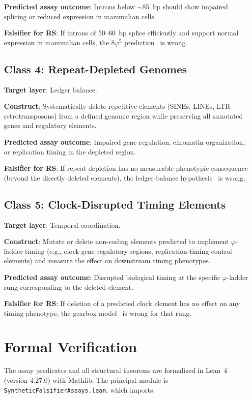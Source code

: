 \documentclass[11pt,twocolumn]{article}
\begin{document}
\textbf{Predicted assay outcome}: Introns below $\sim$85~bp should show
impaired splicing or reduced expression in mammalian cells.

\textbf{Falsifier for RS}: If introns of 50--60~bp splice efficiently and
support normal expression in mammalian cells, the $8\varphi^5$
prediction~\cite{Paper7} is wrong.

\subsection{Class 4: Repeat-Depleted Genomes}

\textbf{Target layer}: Ledger balance.

\textbf{Construct}: Systematically delete repetitive elements (SINEs,
LINEs, LTR retrotransposons) from a defined genomic region while
preserving all annotated genes and regulatory elements.

\textbf{Predicted assay outcome}: Impaired gene regulation, chromatin
organization, or replication timing in the depleted region.

\textbf{Falsifier for RS}: If repeat depletion has no measurable
phenotypic consequence (beyond the directly deleted elements), the
ledger-balance hypothesis~\cite{Paper4} is wrong.

\subsection{Class 5: Clock-Disrupted Timing Elements}

\textbf{Target layer}: Temporal coordination.

\textbf{Construct}: Mutate or delete non-coding elements predicted to
implement $\varphi$-ladder timing (e.g., clock gene regulatory regions,
replication-timing control elements) and measure the effect on downstream
timing phenotypes.

\textbf{Predicted assay outcome}: Disrupted biological timing at the
specific $\varphi$-ladder rung corresponding to the deleted element.

\textbf{Falsifier for RS}: If deletion of a predicted clock element has
no effect on any timing phenotype, the gearbox model~\cite{Paper8} is
wrong for that rung.

\section{Formal Verification}

The assay predicates and all structural theorems are formalized in
Lean~4 (version 4.27.0) with Mathlib. The principal module is
\texttt{SyntheticFalsifierAssays.lean}, which imports:
\end{document}
